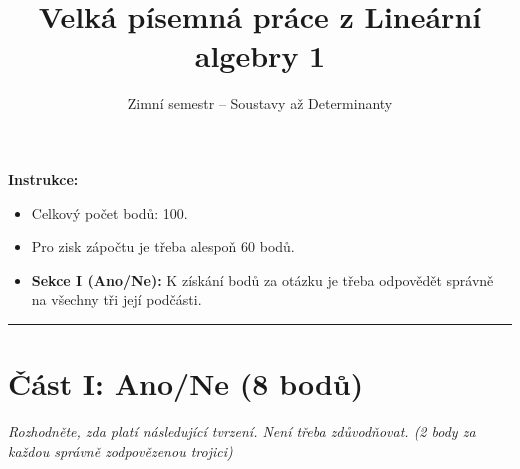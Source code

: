\documentclass[a4paper,11pt]{article}
\title{\textbf{Velká písemná práce z Lineární algebry 1}}
\author{Zimní semestr -- Soustavy až Determinanty}
\date{}
\begin{document}
\maketitle

\noindent \textbf{Instrukce:}
\begin{itemize}
    \item Celkový počet bodů: 100.
    \item Pro zisk zápočtu je třeba alespoň 60 bodů.
    \item \textbf{Sekce I (Ano/Ne):} K získání bodů za otázku je třeba odpovědět správně na všechny tři její podčásti.
\end{itemize}

\hrule
\vspace{0.5cm}

\section*{Část I: Ano/Ne (8 bodů)}
\textit{Rozhodněte, zda platí následující tvrzení. Není třeba zdůvodňovat. (2 body za každou správně zodpovězenou trojici)}
\end{document}
